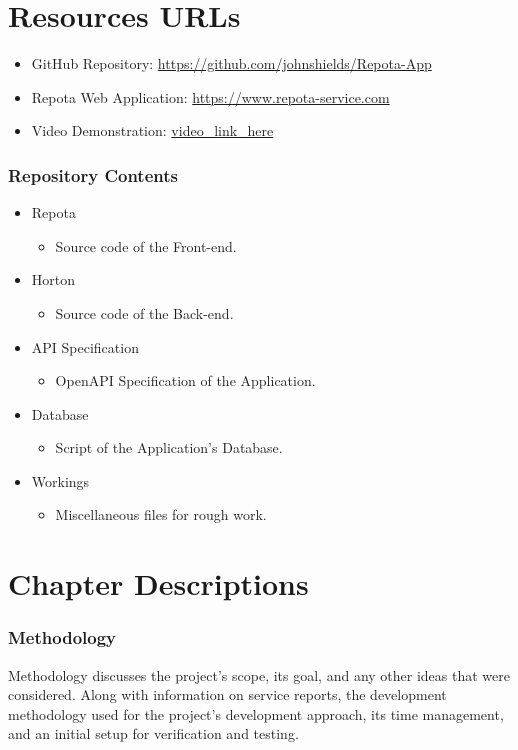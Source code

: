 \section{Resources URLs}
\begin{itemize}
    \item GitHub Repository: 
    \url{https://github.com/johnshields/Repota-App}
    \item Repota Web Application: 
    \url{https://www.repota-service.com}
    \item Video Demonstration: 
    \url{video_link_here}
\end{itemize}

\subsubsection{Repository Contents}
\begin{itemize}
  \item Repota
    \begin{itemize}
    \item Source code of the Front-end.
    \end{itemize}
  \item Horton
    \begin{itemize}
    \item Source code of the Back-end.
    \end{itemize}
  \item API Specification
    \begin{itemize}
    \item OpenAPI Specification of the Application.
    \end{itemize}
  \item Database
    \begin{itemize}
    \item Script of the Application's Database.
    \end{itemize}
  \item Workings
    \begin{itemize}
    \item Miscellaneous files for rough work. 
    \end{itemize}
\end{itemize}

\newpage
\section{Chapter Descriptions}
\subsubsection{Methodology}
Methodology discusses the project's scope, its goal, and any other ideas that were considered. Along with information on service reports, the development methodology used for the project's development approach, its time management, and an initial setup for verification and testing.

